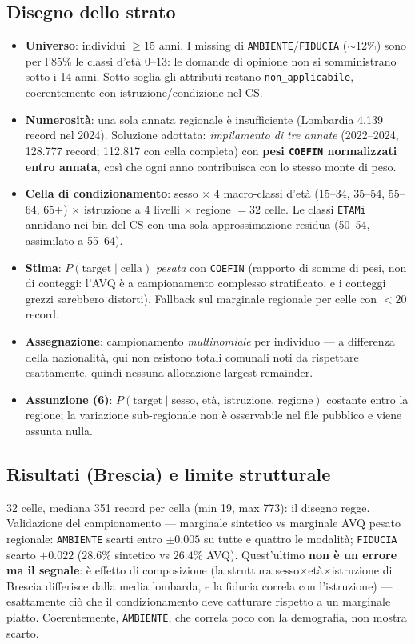 \documentclass[11pt,a4paper]{article}
\newcommand{\code}[1]{\texttt{#1}}
\begin{document}
\subsection{Disegno dello strato}
\begin{itemize}[leftmargin=*,itemsep=1pt]
  \item \textbf{Universo}: individui $\ge15$ anni. I missing di
  \code{AMBIENTE}/\code{FIDUCIA} ($\sim$12\%) sono per l'85\% le classi
  d'et\`a 0--13: le domande di opinione non si somministrano sotto i 14
  anni. Sotto soglia gli attributi restano \code{non\_applicabile},
  coerentemente con istruzione/condizione nel CS.
  \item \textbf{Numerosit\`a}: una sola annata regionale \`e insufficiente
  (Lombardia 4.139 record nel 2024). Soluzione adottata: \emph{impilamento
  di tre annate} (2022--2024, 128.777 record; 112.817 con cella completa)
  con \textbf{pesi \code{COEFIN} normalizzati entro annata}, cos\`i che
  ogni anno contribuisca con lo stesso monte di peso.
  \item \textbf{Cella di condizionamento}: sesso $\times$ 4 macro-classi
  d'et\`a (15--34, 35--54, 55--64, 65+) $\times$ istruzione a 4 livelli
  $\times$ regione $=32$ celle. Le classi \code{ETAMi} annidano nei bin
  del CS con una sola approssimazione residua (50--54, assimilato a
  55--64).
  \item \textbf{Stima}: $P(\text{target}\mid\text{cella})$ \emph{pesata}
  con \code{COEFIN} (rapporto di somme di pesi, non di conteggi: l'AVQ \`e
  a campionamento complesso stratificato, e i conteggi grezzi sarebbero
  distorti). Fallback sul marginale regionale per celle con $<20$ record.
  \item \textbf{Assegnazione}: campionamento \emph{multinomiale} per
  individuo --- a differenza della nazionalit\`a, qui non esistono totali
  comunali noti da rispettare esattamente, quindi nessuna allocazione
  largest-remainder.
  \item \textbf{Assunzione (6)}: $P(\text{target}\mid \text{sesso, et\`a,
  istruzione, regione})$ costante entro la regione; la variazione
  sub-regionale non \`e osservabile nel file pubblico e viene assunta
  nulla.
\end{itemize}

\subsection{Risultati (Brescia) e limite strutturale}
32 celle, mediana 351 record per cella (min 19, max 773): il disegno
regge. Validazione del campionamento --- marginale sintetico vs marginale
AVQ pesato regionale: \code{AMBIENTE} scarti entro $\pm0.005$ su tutte e
quattro le modalit\`a; \code{FIDUCIA} scarto $+0.022$
($28.6\%$ sintetico vs $26.4\%$ AVQ). Quest'ultimo \textbf{non \`e un
errore ma il segnale}: \`e effetto di composizione (la struttura
sesso$\times$et\`a$\times$istruzione di Brescia differisce dalla media
lombarda, e la fiducia correla con l'istruzione) --- esattamente ci\`o che
il condizionamento deve catturare rispetto a un marginale piatto.
Coerentemente, \code{AMBIENTE}, che correla poco con la demografia, non
mostra scarto.
\end{document}
